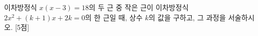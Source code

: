 이차방정식 $x(x-3)=18$의 두 근 중 작은 근이 이차방정식 $2x^2+(k+1)x+2k=0$의 한 근일 때, 상수 $k$의 값을 구하고, 그 과정을 서술하시오. \mbox{[5점]}
